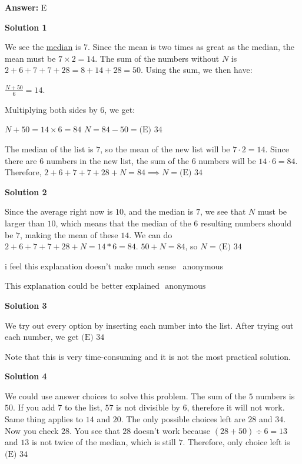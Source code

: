 \begin{enumerate}
 \textbf{Answer: }E



\textbf{Solution 1}

We see the \href{https://artofproblemsolving.com/wiki/index.php?title=Median}{median} is $7$. Since the mean is two times as great as the median, the mean must be $7 \times 2 = 14$. The sum of the numbers without $N$ is $2 + 6 + 7 + 7 + 28 = 8 + 14 + 28 = 50$. Using the sum, we then have:

 $\frac{N + 50}{6} = 14$. 

 Multiplying both sides by $6$, we get:

 $N + 50 = 14 \times 6 = 84$
$N = 84 - 50 = \boxed{\text{(E)\ 34}}$

 The median of the list is $7$, so the mean of the new list will be $7 \cdot 2 = 14$. Since there are $6$ numbers in the new list, the sum of the $6$ numbers will be $14 \cdot 6 = 84$. Therefore, $2+6+7+7+28+N = 84 \implies N = \boxed{\text{(E)\ 34}}$




\textbf{Solution 2}

Since the average right now is $10$, and the median is $7$, we see that $N$ must be larger than $10$, which means that the median of the 6 resulting numbers should be $7$, making the mean of these $14$. We can do $2 + 6 + 7 + 7 + 28 + N = 14 * 6 = 84$. $50 + N = 84$, so $N$ = $\boxed{\text{(E)\ 34}}$

 i feel this explanation doesn’t make much sense ~anonymous

 $\text{This explanation could be better explained ~anonymous}$




\textbf{Solution 3}

We try out every option by inserting each number into the list. After trying out each number, we get $\boxed{\text{(E)\ 34}}$

 Note that this is very time-consuming and it is not the most practical solution.

 



\textbf{Solution 4}

We could use answer choices to solve this problem. The sum of the $5$ numbers is $50$. If you add $7$ to the list, $57$ is not divisible by $6$, therefore it will not work. Same thing applies to $14$ and $20$. The only possible choices left are $28$ and $34$. Now you check $28$. You see that $28$ doesn't work because $(28+50) \div 6 = 13$ and $13$ is not twice of the median, which is still $7$. Therefore, only choice left is $\boxed{\text{(E)\ 34}}$





\end{enumerate}
